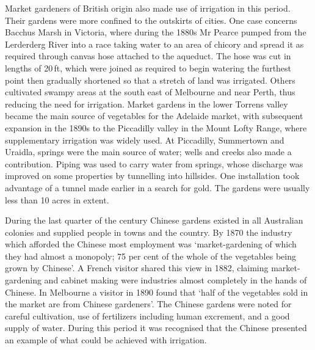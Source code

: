 Market gardeners of British origin also made use of irrigation in this
period.  Their gardens were more confined to the outskirts of cities.
One case concerns Bacchus Marsh in Victoria, where during the 1880s Mr
Pearce pumped from the Lerderderg River into a race taking water to an
area of chicory and spread it as required through canvas hose attached
to the aqueduct.  The hose was cut in lengths of 20\,ft, which were
joined as required to begin watering the furthest point then gradually
shortened so that a stretch of land was irrigated.  Others cultivated swampy areas at the south
east of Melbourne and near Perth, thus reducing the need for
irrigation.  Market gardens in the lower Torrens valley became the
main source of vegetables for the Adelaide market, with subsequent
expansion in the 1890s to the Piccadilly valley in the Mount Lofty
Range, where supplementary irrigation was widely used.  At Piccadilly,
Summertown and Uraidla, springs were the main source of water; wells
and creeks also made a contribution.  Piping was used to carry water
from springs, whose discharge was improved on some properties by
tunnelling into hillsides.  One installation took advantage of a
tunnel made earlier in a search for gold.  The gardens were usually
less than 10 acres in extent.

During the last quarter of the century Chinese gardens existed in all
Australian colonies and supplied people in towns and the country.  By
1870 the industry which afforded the Chinese most employment was
`market-gardening of which they had almost a monopoly; 75 per cent of
the whole of the vegetables being grown by
Chinese'.  A French visitor shared this
view in 1882, claiming market-gardening and cabinet making were
industries almost completely in the hands of Chinese.  In Melbourne a visitor in 1890 found that `half of the
vegetables sold in the market are from Chinese
gardeners'.  The Chinese gardens were
noted for careful cultivation, use of fertilizers including human
excrement, and a good supply of water.  During this period it was
recognised that the Chinese presented an example of what could be
achieved with irrigation.

